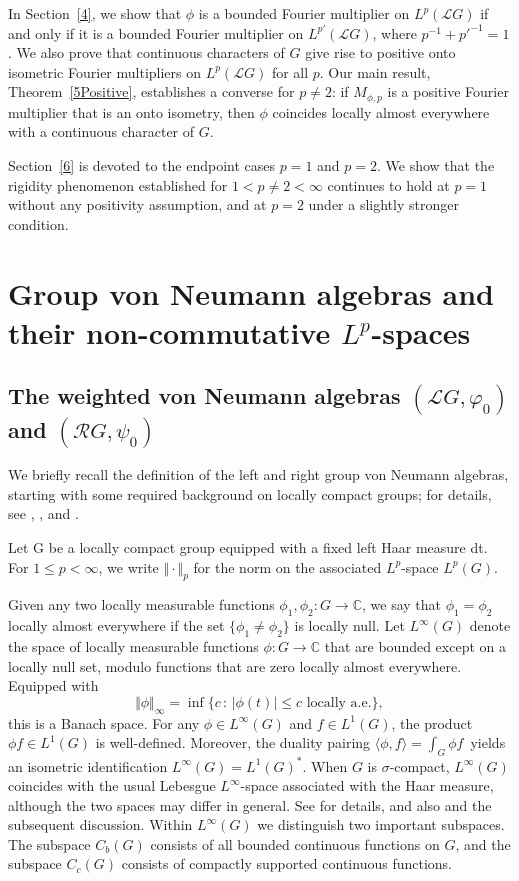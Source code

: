 \documentclass[12pt]{amsart}
\newcommand{\Cdb}{\mbox{$\mathbb{C}$}}
\newcommand{\norm}[1]{\Vert#1\Vert}
\theoremstyle{remark}
\theoremstyle{definition}
\numberwithin{equation}{section}
\begin{document}
In Section~\ref{4}, we show that $\phi$ is a bounded Fourier multiplier on $L^p(\mathcal L G)$ if and only if it is a bounded Fourier multiplier on $L^{p'}(\mathcal L G)$, where $p^{-1} + {p'}^{-1} = 1$. We also prove that continuous characters of $G$ give rise to positive onto isometric Fourier multipliers on $L^p(\mathcal L G)$ for all $p$. Our main result, Theorem~\ref{5Positive}, establishes a converse for $p \neq 2$: if $M_{\phi,p}$ is a positive Fourier multiplier that is an onto isometry, then $\phi$ coincides locally almost everywhere with a continuous character of $G$.

Section~\ref{6} is devoted to the endpoint cases $p=1$ and $p=2$. We show that the rigidity phenomenon established for $1<p\neq 2<\infty$ continues to hold at $p=1$ without any positivity assumption, and at $p=2$ under a slightly stronger condition.



\section{Group von Neumann algebras and their non-commutative $L^p$-spaces}
\subsection{The weighted von Neumann algebras $({\mathcal L}G,\varphi_0)$ and $({\mathcal R}G,\psi_0)$}

We briefly recall the definition of the left and right group von Neumann algebras, starting with some required background on locally compact groups; for details, see \cite{Fo}, \cite[Section 2]{Haag}, \cite[Chapter 18]{Stra}  and \cite[Section VII.3]{Tak2}. 

Let G be a locally compact group equipped with a fixed left Haar measure dt. For $1 \leq p < \infty$, we write $\norm{\cdot}_p$ for the norm on the associated $L^p$-space $L^p(G)$.


Given any two locally measurable functions $\phi_1,\phi_2\colon G \to \Cdb$, we say that $\phi_1=\phi_2$ locally almost everywhere if the set $\{\phi_1\not=\phi_2\}$ is locally null. Let $L^\infty(G)$ denote the space of locally measurable functions $\phi \colon G \to \Cdb$ that are bounded except on a locally null set, modulo functions that are zero locally almost everywhere. Equipped with
\[
\norm{\phi}_{\infty} = \inf \{ c \,:\, |\phi(t)| \le c \text{ locally a.e.} \},
\]
this is a Banach space. For any $\phi\in L^\infty(G)$ and $f\in L^1(G)$, the product $\phi f\in L^1(G)$ is well-defined. Moreover, the duality pairing $\langle\phi,f\rangle=\int_G\phi f\,$ yields an isometric identification $L^\infty(G)=L^1(G)^*$. When $G$ is $\sigma$-compact, $L^\infty(G)$ coincides with the usual Lebesgue $L^\infty$-space associated with the Haar measure, although the two spaces may differ in general. See \cite[Section 2.3]{Fo} for details, and also \cite[Lemma 3.2]{AKLZ} and the subsequent discussion. Within $L^\infty(G)$ we distinguish two important subspaces. The subspace $C_b(G)$ consists of all bounded continuous functions on $G$, and the subspace $C_c(G)$ consists of compactly supported continuous functions.
\end{document}
